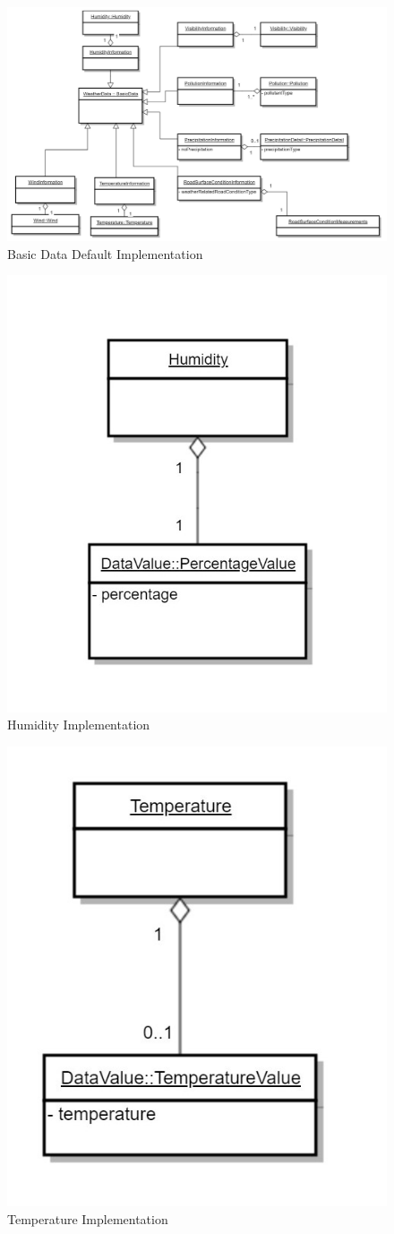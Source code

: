 \begin{figure}
	\begin{center}
		\includegraphics[width=0.8\columnwidth]{images/uml_4_28}
	\end{center}
	\caption{Basic Data Default Implementation}
	\label{fig:app_uml_4_28}
\end{figure}
\begin{figure}
	\begin{center}
		\includegraphics[width=0.5\columnwidth]{images/uml_5_14}
	\end{center}
	\caption{Humidity Implementation}
	\label{fig:app_uml_5_14}
\end{figure}
\begin{figure}
	\begin{center}
		\includegraphics[width=0.45\columnwidth]{images/uml_5_18}
	\end{center}
	\caption{Temperature Implementation}
	\label{fig:app_uml_5_18}
\end{figure}
